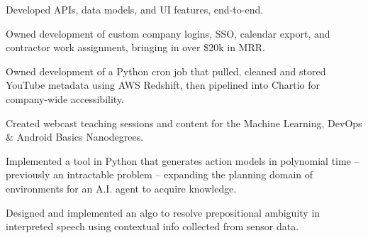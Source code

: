 \documentclass[]{deedy-resume-openfont}
\begin{document}
\begin{minipage}[t]{0.66\textwidth}
\begin{tightemize}
\item Developed APIs, data models, and UI features, end-to-end.
\item Owned development of custom company logins, SSO, calendar export, and contractor work assignment, bringing in over \$20k in MRR.

\end{tightemize}
\sectionsep

\begin{tightemize}

\item Owned development of a Python cron job that pulled, cleaned and stored YouTube metadata using AWS Redshift, then pipelined into Chartio for company-wide accessibility.
\item Created webcast teaching sessions and content for the Machine Learning, DevOps \& Android Basics Nanodegrees.

\end{tightemize}
\sectionsep

\begin{tightemize}
\item Implemented a tool in Python that generates action models in polynomial time -- previously an intractable problem -- expanding the planning domain of environments for an A.I. agent to acquire knowledge.
\item Designed and implemented an algo to resolve prepositional ambiguity in interpreted speech using contextual info collected from sensor data.
\end{tightemize}
\sectionsep




\end{minipage}
\end{document}
